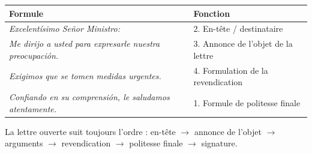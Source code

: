 \documentclass[11pt]{article}
\newcommand{\esp}[1]{\ifmmode\text{\textit{#1}}\else\begingroup\selectlanguage{spanish}\itshape #1\endgroup\fi}
\begin{document}
\begin{corrige}
\begin{center}
\begin{tabularx}{\linewidth}{|X|X|}
\hline
\rowcolor{popblueL} \textbf{Formule} & \textbf{Fonction} \\
\hline
\esp{Excelentísimo Señor Ministro:} & 2. En-tête / destinataire \\
\hline
\esp{Me dirijo a usted para expresarle nuestra preocupación.} & 3. Annonce de l'objet de la lettre \\
\hline
\esp{Exigimos que se tomen medidas urgentes.} & 4. Formulation de la revendication \\
\hline
\esp{Confiando en su comprensión, le saludamos atentamente.} & 1. Formule de politesse finale \\
\hline
\end{tabularx}
\end{center}
\end{corrige}

\begin{aretenir}
La lettre ouverte suit toujours l'ordre : en-tête $\rightarrow$ annonce de l'objet $\rightarrow$ arguments $\rightarrow$ revendication $\rightarrow$ politesse finale $\rightarrow$ signature.
\end{aretenir}
\end{document}
